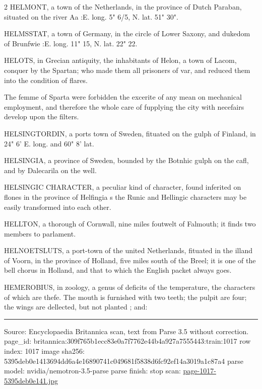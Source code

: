 \documentclass[10pt]{article}
\begin{document}
\begin{multicols}{2}
HELMONT, a town of the Netherlands, in the province of Dutch Paraban, situated on the river Aa :E. long. 5" 6/5, N. lat. 51" 30".

HELMSSTAT, a town of Germany, in the circle of Lower Saxony, and dukedom of Brunfwie :E. long. 11" 15, N. lat. 22" 22.

HELOTS, in Grecian antiquity, the inhabitants of Helon, a town of Lacom, conquer by the Spartan; who made them all prisoners of var, and reduced them into the condition of flares.

The femme of Sparta were forbidden the excerite of any mean on mechanical employment, and therefore the whole care of fupplying the city with necefairs develop upon the filters.

HELSINGTORDIN, a ports town of Sweden, fituated on the gulph of Finland, in 24" 6' E. long. and 60" 8' lat.

HELSINGIA, a province of Sweden, bounded by the Botnhic gulph on the cafl, and by Dalecarila on the well.

HELSINGIC CHARACTER, a peculiar kind of character, found inferited on flones in the province of Helfingia s the Runic and Hellingic characters may be easily transformed into each other.

HELLTON, a thorough of Cornwall, nine miles foutwelt of Falmouth; it finds two members to parlament.

HELNOETSLUTS, a port-town of the united Netherlands, fituated in the illand of Voorn, in the province of Holland, five miles south of the Breel; it is one of the bell chorus in Holland, and that to which the English packet always goes.

HEMEROBIUS, in zoology, a genus of deficits of the temperature, the characters of which are thefe. The mouth is furnished with two teeth; the pulpit are four; the wings are dellected, but not planted ; and:

\end{multicols}
\vfill\par\noindent\rule{\linewidth}{0.4pt}\par
{\scriptsize\color{gray}\noindent Source: Encyclopaedia Britannica scan, text from Parse 3.5 without correction. page\_id: britannica:309f765b1ecc83e0a7f7762e44b4a927a7555443:train:1017 \quad row index: 1017 \quad image sha256: 5395deb0e1413694dd6a4e16890741c049681f5838d6fc92ef14a3019a1c87a4 \quad parse model: nvidia/nemotron-3.5-parse \quad parse finish: stop \quad scan: \href{../scans/page-1017-5395deb0e141.jpg}{page-1017-5395deb0e141.jpg}\par}
\end{document}
